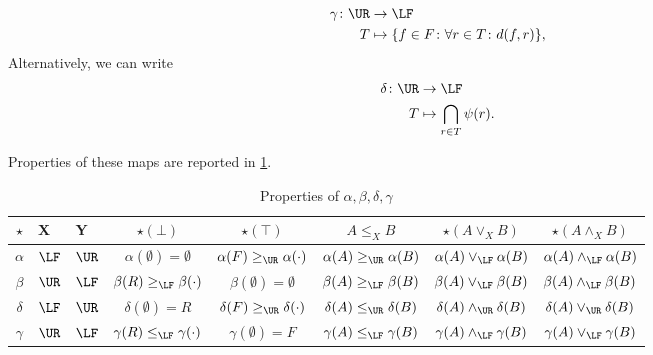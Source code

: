 \begin{equation}
\label{eq:galoisgamma}
    \begin{aligned}
    \gamma \colon \UR&\to \LF\\
    T&\mapsto \{f\in F \colon \forall {r\in T}\colon d(f,r)\},
    \end{aligned}
\end{equation}
Alternatively, we can write
\begin{equation}
    \begin{aligned}
    \delta\colon \UR &\to \LF\\
    T&\mapsto \bigcap_{r\in T}\psi(r).
    \end{aligned}
\end{equation}

Properties of these maps are reported in \cref{tab:galoisproperties}.


\begin{table}[h!]
    \begin{center}
    \begin{tabular}{c|l|l|c|c|c|c|c}
         $\star$&X&Y&$\star(\bot)$&$\star(\top)$&$A\leq_X B$ &$\star(A\vee_X B)$&$\star(A\wedge_X B)$\\
         \hline
         $\alpha$&$\LF$&$\UR$&$\alpha(\emptyset)=\emptyset$&$\alpha(F)\geq_{\UR} \alpha(\cdot)$&$\alpha(A)\geq_{\UR} \alpha(B)$& $\alpha(A)\vee_{\LF}\alpha(B)$&$\alpha(A)\wedge_{\LF}\alpha(B)$\\
         \hline 
         $\beta$&$\UR$&$\LF$&$\beta(R)\geq_{\LF}\beta(\cdot)$&$\beta(\emptyset)=\emptyset$&$\beta(A)\geq_{\LF} \beta(B)$&$\beta(A)\vee_{\LF}\beta(B)$&$\beta(A)\wedge_{\LF}\beta(B)$\\
         \hline
         $\delta$&$\LF$&$\UR$&$\delta(\emptyset)=R$&$\delta(F)\geq_{\UR}\delta(\cdot)$&$\delta(A)\leq_{\UR} \delta(B)$&$\delta(A)\wedge_{\UR}\delta(B)$&$\delta(A)\vee_{\UR}\delta(B)$\\
         \hline
         $\gamma$&$\UR$&$\LF$&$\gamma(R)\leq_{\LF}\gamma(\cdot)$&$\gamma(\emptyset)=F$&$\gamma(A) \leq_{\LF} \gamma(B)$&$\gamma(A)\wedge_{\LF}\gamma(B)$&$\gamma(A)\vee_{\LF}\gamma(B)$
    \end{tabular}
    \caption{Properties of $\alpha,\beta,\delta,\gamma$}
    \label{tab:galoisproperties}
    \end{center}
\end{table}


